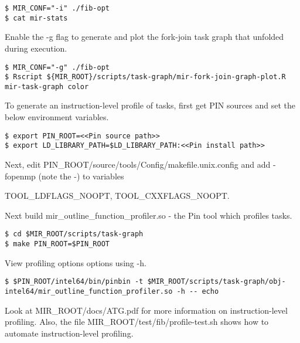 \documentclass[11pt,a4paper,notitlepage]{article}
\begin{document}
\begin{lstlisting}[style=BashInputStyle]
$ MIR_CONF="-i" ./fib-opt
$ cat mir-stats
\end{lstlisting}

Enable the -g flag to generate and plot the fork-join task graph that unfolded during execution.

\begin{lstlisting}[style=BashInputStyle]
$ MIR_CONF="-g" ./fib-opt
$ Rscript ${MIR_ROOT}/scripts/task-graph/mir-fork-join-graph-plot.R mir-task-graph color
\end{lstlisting}

To generate an instruction-level profile of tasks, first get PIN sources and set the below environment variables.
\begin{lstlisting}[style=BashInputStyle]
$ export PIN_ROOT=<<Pin source path>>
$ export LD_LIBRARY_PATH=$LD_LIBRARY_PATH:<<Pin install path>>
\end{lstlisting}

Next, edit PIN\_ROOT/source/tools/Config/makefile.unix.config and add -fopenmp (note the -) to variables 
\begin{tiny}{TOOL\_LDFLAGS\_NOOPT, TOOL\_CXXFLAGS\_NOOPT}.\end{tiny}

Next build mir\_outline\_function\_profiler.so - the Pin tool which profiles tasks.
\begin{lstlisting}[style=BashInputStyle]
$ cd $MIR_ROOT/scripts/task-graph
$ make PIN_ROOT=$PIN_ROOT
\end{lstlisting}

View profiling options options using -h.
\begin{lstlisting}[style=BashInputStyle]
$ $PIN_ROOT/intel64/bin/pinbin -t $MIR_ROOT/scripts/task-graph/obj-intel64/mir_outline_function_profiler.so -h -- echo
\end{lstlisting}

Look at MIR\_ROOT/docs/ATG.pdf for more information on instruction-level profiling.
Also, the file MIR\_ROOT/test/fib/profile-test.sh shows how to automate instruction-level profiling.
\end{document}
